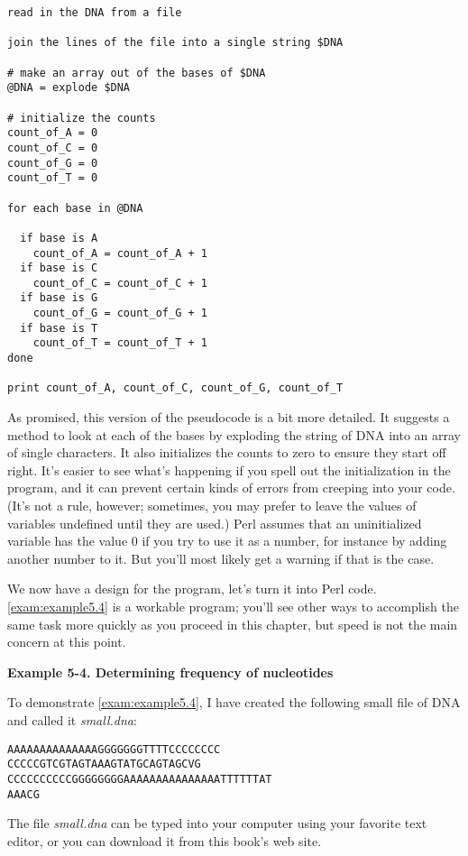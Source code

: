 \begin{lstlisting}
read in the DNA from a file

join the lines of the file into a single string $DNA

# make an array out of the bases of $DNA
@DNA = explode $DNA

# initialize the counts
count_of_A = 0
count_of_C = 0
count_of_G = 0
count_of_T = 0

for each base in @DNA

  if base is A
    count_of_A = count_of_A + 1
  if base is C
    count_of_C = count_of_C + 1
  if base is G
    count_of_G = count_of_G + 1
  if base is T
    count_of_T = count_of_T + 1
done

print count_of_A, count_of_C, count_of_G, count_of_T
\end{lstlisting}

As promised, this version of the pseudocode is a bit more detailed. It suggests a method to look at each of the bases by exploding the string of DNA into an array of single characters. It also initializes the counts to zero to ensure they start off right. It's easier to see what's happening if you spell out the initialization in the program, and it can prevent certain kinds of errors from creeping into your code. (It's not a rule, however; sometimes, you may prefer to leave the values of variables undefined until they are used.) Perl assumes that an uninitialized variable has the value 0 if you try to use it as a number, for instance by adding another number to it. But you'll most likely get a warning if that is the case.

We now have a design for the program, let's turn it into Perl code.  \autoref{exam:example5.4} is a workable program; you'll see other ways to accomplish the same task more quickly as you proceed in this chapter, but speed is not the main concern at this point. 

\textbf{Example 5-4. Determining frequency of nucleotides}


To demonstrate \autoref{exam:example5.4}, I have created the following small file of DNA and called it \textit{small.dna}: 

\begin{lstlisting}
AAAAAAAAAAAAAAGGGGGGGTTTTCCCCCCCC
CCCCCGTCGTAGTAAAGTATGCAGTAGCVG
CCCCCCCCCCGGGGGGGGAAAAAAAAAAAAAAATTTTTTAT
AAACG
\end{lstlisting}

The file \textit{small.dna} can be typed into your computer using your favorite text editor, or you can download it from this book's web site.

